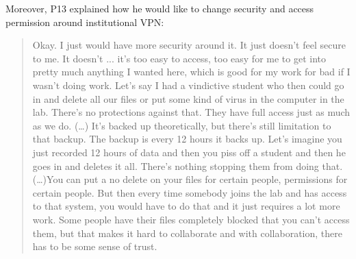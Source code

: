 Moreover, P13 explained how he would like to change security and access
permission around institutional VPN: \begin{quote}Okay. I just would have more
    security around it. It just doesn't feel secure to me. It doesn't ... it's
    too easy to access, too easy for me to get into pretty much anything I
    wanted here, which is good for my work for bad if I wasn't doing work.
    Let's say I had a vindictive student who then could go in and delete all
    our files or put some kind of virus in the computer in the lab. There's no
    protections against that. They have full access just as much as we do. (…)
    It's backed up theoretically, but there's still limitation to that backup.
    The backup is every 12 hours it backs up. Let's imagine you just recorded
    12 hours of data and then you piss off a student and then he goes in and
    deletes it all. There's nothing stopping them from doing that.  (\dots)You
can put a no delete on your files for certain people, permissions for certain
people. But then every time somebody joins the lab and has access to that
system, you would have to do that and it just requires a lot more work. Some
people have their files completely blocked that you can't access them, but
that makes it hard to collaborate and with collaboration, there has to be some
sense of trust.\end{quote}



